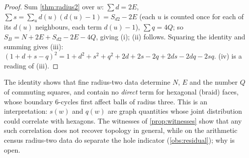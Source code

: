 \begin{proof}
Sum \cref{thm:radius2} over $w$: $\sum d=2E$, $\sum s=\sum_u d(u)(d(u)-1)=S_{d2}-2E$ (each $u$ is counted once for each of its $d(u)$ neighbours, each term $d(u)-1$), $\sum q=4Q$; so $S_B=N+2E+S_{d2}-2E-4Q$, giving (i); (ii) follows. Squaring the identity and summing gives (iii): $(1+d+s-q)^2=1+d^2+s^2+q^2+2d+2s-2q+2ds-2dq-2sq$. (iv) is a reading of (iii).
\end{proof}
\begin{remark}
The identity shows that fine radius-two data determine $N$, $E$ and the number $Q$ of commuting squares, and contain no \emph{direct} term for hexagonal (braid) faces, whose boundary $6$-cycles first affect balls of radius three. This is an interpretation: $s(w)$ and $q(w)$ are graph quantities whose joint distribution could correlate with hexagons. The witnesses of \cref{prop:witnesses} show that any such correlation does not recover topology in general, while on the arithmetic census radius-two data do separate the hole indicator (\cref{obs:residual}); why is open.
\end{remark}

